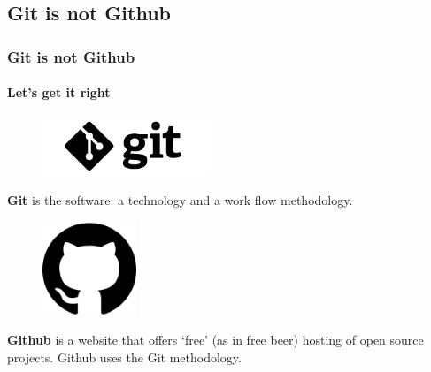\documentclass{}{beamer}
\begin{document}

\subsection{Git is not Github} %
\label{sub:git-not-github}

\begin{frame}[allowframebreaks]
	\frametitle{Git is not Github}
	\framesubtitle{Let's get it right}

	\begin{figure}[h]
		\centering
		\includegraphics[width=0.45\textwidth]{logo}
		\label{fig:git_logo}
	\end{figure}

	\textbf{Git} is the software: a technology and a work flow methodology.

	\framebreak

	\begin{figure}[h]
		\centering
		\includegraphics[width=0.25\textwidth]{octocat}
		\label{fig:github_logo}
	\end{figure}

	\textbf{Github} is a website that offers `free' (as in free beer) hosting of open source projects. Github uses the Git methodology.
\end{frame}


\end{document}

